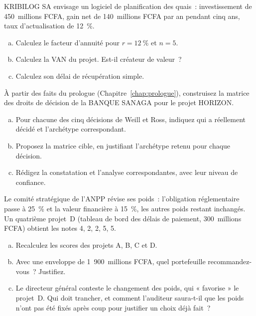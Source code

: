 \bigskip

\begin{boxexo}[title={\ding{45}\quad Exercice~3.1. Calculer une VAN \niveaubase}]
KRIBILOG SA envisage un logiciel de planification des quais~:
investissement de 450~millions FCFA, gain net de 140~millions FCFA par an
pendant cinq ans, taux d'actualisation de 12~\%.
\begin{enumerate}[(a)]
    \item Calculez le facteur d'annuité pour $r=12~\%$ et $n=5$.
    \item Calculez la VAN du projet. Est-il créateur de valeur~?
    \item Calculez son délai de récupération simple.
\end{enumerate}
\end{boxexo}

\begin{boxexo}[title={\ding{45}\quad Exercice~3.2. La matrice de la BANQUE SANAGA \niveaumoyen}]
À partir des faits du prologue (Chapitre~\ref{chap:prologue}), construisez
la matrice des droits de décision de la BANQUE SANAGA pour le projet
HORIZON.
\begin{enumerate}[(a)]
    \item Pour chacune des cinq décisions de Weill et Ross, indiquez qui
          a réellement décidé et l'archétype correspondant.
    \item Proposez la matrice cible, en justifiant l'archétype retenu pour
          chaque décision.
    \item Rédigez la constatation et l'analyse correspondantes, avec leur
          niveau de confiance.
\end{enumerate}
\end{boxexo}

\begin{boxexo}[title={\ding{45}\quad Exercice~3.3. Arbitrer sous contrainte \niveauexpert}]
Le comité stratégique de l'ANPP révise ses poids~: l'obligation
réglementaire passe à 25~\% et la valeur financière à 15~\%, les autres
poids restant inchangés. Un quatrième projet~D (tableau de bord des
délais de paiement, 300~millions FCFA) obtient les notes 4, 2, 2, 5, 5.
\begin{enumerate}[(a)]
    \item Recalculez les scores des projets A, B, C et D.
    \item Avec une enveloppe de 1~900~millions FCFA, quel portefeuille
          recommandez-vous~? Justifiez.
    \item Le directeur général conteste le changement des poids, qui
          « favorise » le projet~D. Qui doit trancher, et comment
          l'auditeur saura-t-il que les poids n'ont pas été fixés après
          coup pour justifier un choix déjà fait~?
\end{enumerate}
\end{boxexo}

